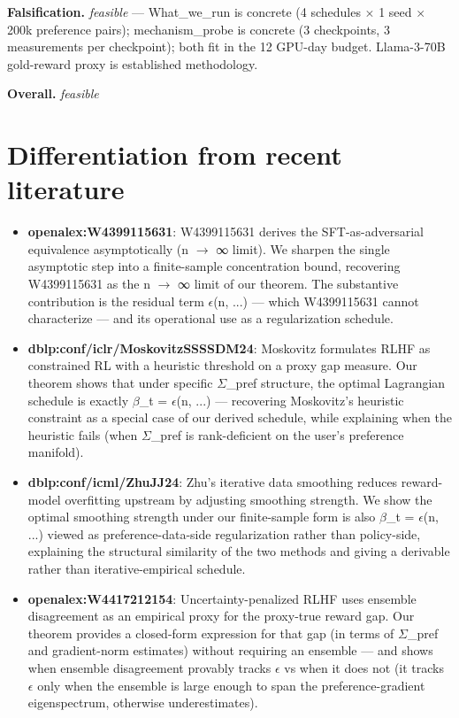 \documentclass[10pt,a4paper]{article}
\begin{document}
\begin{tcolorbox}[colback=bgskill, colframe=cblue, title=\textbf{NoveltySkill — Idea Card (L3 Oral-Ready)}, breakable]
\textbf{Falsification.} \emph{ feasible } — What\_we\_run is concrete (4 schedules $\times$ 1 seed $\times$ 200k preference pairs); mechanism\_probe is concrete (3 checkpoints, 3 measurements per checkpoint); both fit in the 12 GPU-day budget. Llama-3-70B gold-reward proxy is established methodology.

\textbf{Overall.} \emph{ feasible }

\section*{Differentiation from recent literature}
\begin{itemize}[leftmargin=*]
  \item \textbf{openalex:W4399115631}: W4399115631 derives the SFT-as-adversarial equivalence asymptotically (n $\to$ ∞ limit). We sharpen the single asymptotic step into a finite-sample concentration bound, recovering W4399115631 as the n $\to$ ∞ limit of our theorem. The substantive contribution is the residual term $\epsilon$(n, ...) --- which W4399115631 cannot characterize --- and its operational use as a regularization schedule.
  \item \textbf{dblp:conf/iclr/MoskovitzSSSSDM24}: Moskovitz formulates RLHF as constrained RL with a heuristic threshold on a proxy gap measure. Our theorem shows that under specific $\Sigma$\_pref structure, the optimal Lagrangian schedule is exactly $\beta$\_t = $\epsilon$(n, ...) --- recovering Moskovitz's heuristic constraint as a special case of our derived schedule, while explaining when the heuristic fails (when $\Sigma$\_pref is rank-deficient on the user's preference manifold).
  \item \textbf{dblp:conf/icml/ZhuJJ24}: Zhu's iterative data smoothing reduces reward-model overfitting upstream by adjusting smoothing strength. We show the optimal smoothing strength under our finite-sample form is also $\beta$\_t = $\epsilon$(n, ...) viewed as preference-data-side regularization rather than policy-side, explaining the structural similarity of the two methods and giving a derivable rather than iterative-empirical schedule.
  \item \textbf{openalex:W4417212154}: Uncertainty-penalized RLHF uses ensemble disagreement as an empirical proxy for the proxy-true reward gap. Our theorem provides a closed-form expression for that gap (in terms of $\Sigma$\_pref and gradient-norm estimates) without requiring an ensemble --- and shows when ensemble disagreement provably tracks $\epsilon$ vs when it does not (it tracks $\epsilon$ only when the ensemble is large enough to span the preference-gradient eigenspectrum, otherwise underestimates).

\end{itemize}
\end{tcolorbox}
\end{document}
